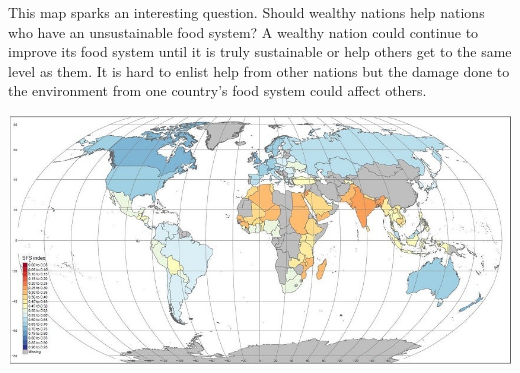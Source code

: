 \documentclass{article}
\begin{document}
This map sparks an interesting question. Should wealthy nations help nations who have an unsustainable food system? A wealthy nation could continue to improve its food system until it is truly sustainable or help others get to the same level as them. It is hard to enlist help from other nations but the damage done to the environment from one country's food system could affect others.

\setlength{\parindent}{0ex}
\includegraphics[width=\textwidth]{map}
\end{document}
